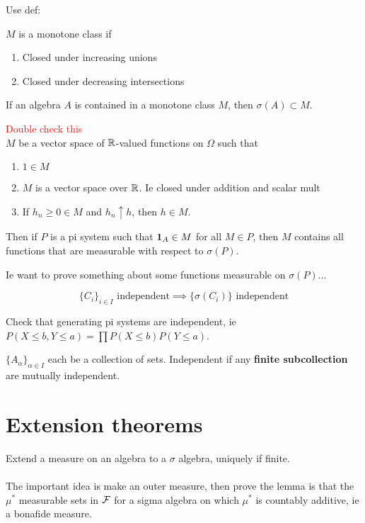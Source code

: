 \documentclass{article}
\newcommand\myworries[1]{\textcolor{red}{#1}}
\begin{document}
\begin{theorem}
Use def:
\begin{definition}
$M$ is a monotone class if 
\begin{enumerate}
	\item Closed under increasing unions
	\item Closed under decreasing intersections
\end{enumerate}
\end{definition}
If an algebra $A$ is contained in a monotone class $M$, then $\sigma(A) \subset M$.
\end{theorem}
\begin{theorem}
\myworries{Double check this}\\
$M$ be a vector space of $\mathbb R$-valued functions on $\Omega$ such that
\begin{enumerate}
	\item $1 \in M$
	\item $M$ is a vector space over $\mathbb R$. Ie closed under addition and scalar mult
	\item If $h_n\geq 0\in M$ and $h_n\uparrow h$, then $h\in M$.
\end{enumerate}
Then if $P$ is a pi system such that $\boldsymbol{1}_A \in M$ for all $M\in P$, then $M$ contains all functions that are measurable with respect to $\sigma(P)$. 
\end{theorem}
Ie want to prove something about some functions measurable on $\sigma(P)$... 



\begin{theorem}
$$\{C_i\}_{i\in I} \text { independent} \implies \{\sigma(C_i)\} \text{ independent} $$
\begin{example}
Check that generating pi systems are independent, ie $P(X\leq b, Y\leq a) = \prod P(X\leq b) P(Y\leq a)$. 
\end{example}

\begin{definition}
$\{A_\alpha\}_{\alpha \in I}$ each be a collection of sets. Independent if any \textbf{finite subcollection }are mutually independent. 
\end{definition}

\end{theorem}
\section{Extension theorems}
\begin{theorem}[Caratheodory]
Extend a measure on an algebra to a $\sigma$ algebra, uniquely if finite.\\ \\

The important idea is make an outer measure, then prove the lemma is that the $\mu^*$ measurable sets in $\mathcal F$ for a sigma algebra on which $\mu^*$ is countably additive, ie a bonafide measure. 
\end{theorem}
\end{document}
